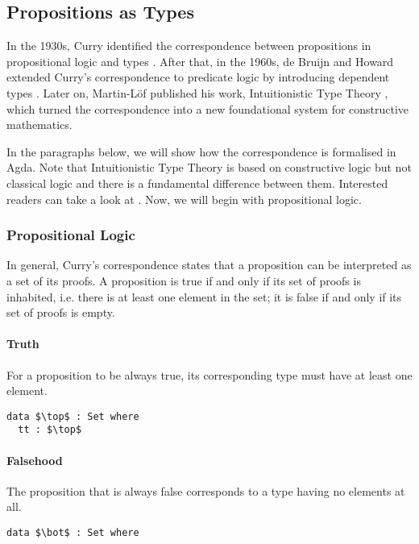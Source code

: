 \subsection{Propositions as Types}
\par In the 1930s, Curry identified the
correspondence between propositions in propositional logic and types
\cite{curry1934}. After that, in the 1960s, de Bruijn and Howard extended
Curry's correspondence to predicate logic by introducing dependent
types \cite{bruijn1968, howard1969}. Later on, Martin-L\"of published
his work, Intuitionistic Type Theory \cite{martin1984}, which turned the correspondence into a new
foundational system for constructive mathematics. 

\par In the paragraphs below, we will show how the correspondence is
formalised in Agda. Note that Intuitionistic Type
Theory is based on constructive logic but not classical logic and there
is a fundamental difference between them. Interested readers can take a look at
\cite{avigad2000}. Now, we will begin with propositional logic. 

\subsubsection{Propositional Logic} 
\par In general, Curry's correspondence
states that a proposition can be interpreted as a set of its proofs. A
proposition is true if and only if its set of proofs is inhabited,
i.e. there is at least one element in the set; it is false if and only
if its set of proofs is empty. 

\paragraph{Truth} For a proposition to be always true, its
corresponding type must have at least one element. 
\begin{lstlisting}[mathescape=true,xleftmargin=.3\textwidth]
data $\top$ : Set where
  tt : $\top$
\end{lstlisting} 

\paragraph{Falsehood} The proposition that is always
false corresponds to a type having no elements at all. 
\begin{lstlisting}[mathescape=true,xleftmargin=.3\textwidth]
data $\bot$ : Set where
\end{lstlisting} 

